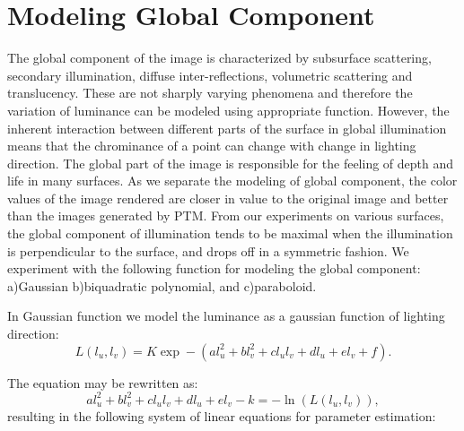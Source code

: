 \section{Modeling Global Component}

The global component of the image is characterized by subsurface scattering,
secondary illumination, diffuse inter-reflections, volumetric scattering and
translucency. These are not sharply varying phenomena and therefore the
variation of luminance can be modeled using appropriate function. However, the
inherent interaction between different parts of the surface in global
illumination means that the chrominance of a point can change with change in
lighting direction. The global part of the image is responsible for the feeling
of depth and life in many surfaces. As we separate the modeling of global
component, the color values of the image rendered are closer in value to the
original image and better than the images generated by PTM. From our experiments
on various surfaces, the global component of illumination tends to be maximal
when the illumination is perpendicular to the surface, and drops off in a
symmetric fashion. We experiment with the following function for modeling the
global component: a)Gaussian b)biquadratic polynomial, and c)paraboloid.



In Gaussian function we model the luminance as a gaussian function of lighting
direction:
\begin{equation}
L(l_u,l_v)=K\exp-(al_u^2 + bl_v^2 + cl_ul_v + dl_u + el_v +f  ).
\end{equation}

The equation may be rewritten as:
\begin{equation}
al_u^2 + bl_v^2 + cl_ul_v + dl_u + el_v -k= -\ln(L(l_u,l_v)),
\end{equation}
resulting in the following system of linear equations for parameter estimation:

